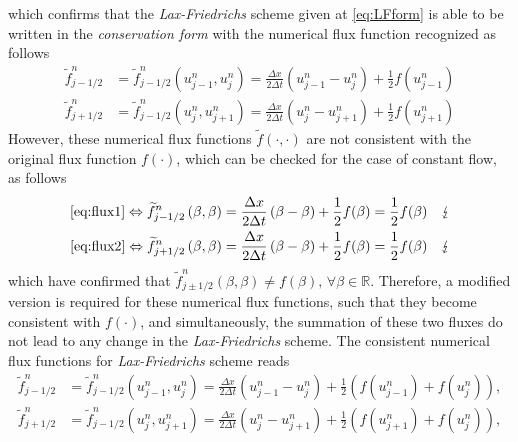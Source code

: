 \documentclass[12pt]{article}
\begin{document}
which confirms that the \emph{Lax-Friedrichs} scheme given at \eqref{eq:LFform}
is able to be written in the \emph{conservation form}
with the numerical flux function recognized as follows
\begin{align}
	\widetilde{f}_{j-1/2}^{n} & =  
	\widetilde{f}_{j-1/2}^{n} \left(u_{j-1}^{n}, u_{j}^{n}\right)
	=
	\frac{\Delta x}{2\Delta t}\left(u_{j-1}^{n} - u_{j}^{n} \right)
	+\frac{1}{2}f(u_{j-1}^{n})      \label{eq:flux1} \\
	\widetilde{f}_{j+1/2}^{n} & =  
	\widetilde{f}_{j-1/2}^{n} \left(u_{j}^{n}, u_{j+1}^{n}\right)
	=
	\frac{\Delta x}{2\Delta t}\left(u_{j}^{n} - u_{j+1}^{n} \right)
	+\frac{1}{2}f(u_{j+1}^{n}) \label{eq:flux2}
\end{align}
However, these numerical flux functions $\widetilde{f}(\cdot,\cdot)$
are not consistent with the original flux function $f(\cdot)$, which 
can be checked for the case of constant flow, as follows
\begin{align}
	\eqref{eq:flux1} \Leftrightarrow
	\widetilde{f}_{j-1/2}^{n} \left(\beta, \beta\right) & =  
	\frac{\Delta x}{2\Delta t}\left(\beta - \beta \right)
	+\frac{1}{2}f(\beta)                                                
	=\frac{1}{2}f(\beta) \quad \lightning                     \\
	\eqref{eq:flux2} \Leftrightarrow
	\widetilde{f}_{j+1/2}^{n} \left(\beta, \beta\right) & =  
	\frac{\Delta x}{2\Delta t}\left(\beta - \beta \right)
	+\frac{1}{2}f(\beta) 
	=\frac{1}{2}f(\beta) \quad \lightning
\end{align}
which have confirmed that 
$\widetilde{f}_{j\pm 1/2}^{n} \left(\beta, \beta\right) \neq f(\beta),\, \forall \beta \in \mathbb{R}$.
Therefore, a modified version is required for these numerical flux functions,
such that they become consistent with $f(\cdot)$, and simultaneously, 
the summation of these two fluxes do not lead to any change in the \emph{Lax-Friedrichs} scheme.
The consistent numerical flux functions for \emph{Lax-Friedrichs} scheme reads
\begin{align}
	\widetilde{f}_{j-1/2}^{n} & =  
	\widetilde{f}_{j-1/2}^{n} \left(u_{j-1}^{n}, u_{j}^{n}\right)
	=
	\frac{\Delta x}{2\Delta t}\left(u_{j-1}^{n} - u_{j}^{n} \right)
	+\frac{1}{2}
	\left(f(u_{j-1}^{n}) + f(u_{j}^{n}) \right),      \label{eq:flux1corr} \\
	\widetilde{f}_{j+1/2}^{n} & =  
	\widetilde{f}_{j-1/2}^{n} \left(u_{j}^{n}, u_{j+1}^{n}\right)
	=
	\frac{\Delta x}{2\Delta t}\left(u_{j}^{n} - u_{j+1}^{n} \right)
	+\frac{1}{2}
	\left( f(u_{j+1}^{n}) + f(u_{j}^{n}) \right), \label{eq:flux2corr}
\end{align}
\end{document}
